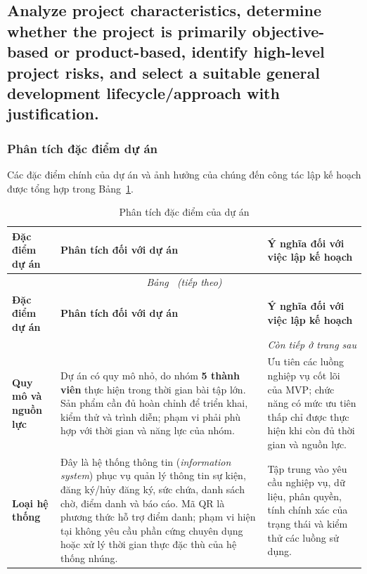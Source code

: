 \subsection{Analyze project characteristics, determine whether the project is primarily objective-based or product-based, identify high-level project risks, and select a suitable general development lifecycle/approach with justification.}

\subsubsection{Phân tích đặc điểm dự án}

Các đặc điểm chính của dự án và ảnh hưởng của chúng đến công tác lập kế hoạch được tổng hợp trong Bảng~\ref{tab:project-characteristics}.

{%
\setlength{\tabcolsep}{4pt}
\renewcommand{\arraystretch}{1.2}
\begin{longtable}{|p{3.1cm}|p{6.1cm}|p{5.5cm}|}
\caption{Phân tích đặc điểm của dự án}\label{tab:project-characteristics}\\
\hline
\textbf{Đặc điểm dự án} & \textbf{Phân tích đối với dự án} & \textbf{Ý nghĩa đối với việc lập kế hoạch} \\
\hline
\endfirsthead
\multicolumn{3}{c}{\textit{Bảng~\thetable{} (tiếp theo)}}\\
\hline
\textbf{Đặc điểm dự án} & \textbf{Phân tích đối với dự án} & \textbf{Ý nghĩa đối với việc lập kế hoạch} \\
\hline
\endhead
\hline
\multicolumn{3}{r}{\textit{Còn tiếp ở trang sau}}\\
\endfoot
\hline
\endlastfoot
\textbf{Quy mô và nguồn lực} & Dự án có quy mô nhỏ, do nhóm \textbf{5 thành viên} thực hiện trong thời gian bài tập lớn. Sản phẩm cần đủ hoàn chỉnh để triển khai, kiểm thử và trình diễn; phạm vi phải phù hợp với thời gian và năng lực của nhóm. & Ưu tiên các luồng nghiệp vụ cốt lõi của MVP; chức năng có mức ưu tiên thấp chỉ được thực hiện khi còn đủ thời gian và nguồn lực. \\
\hline
\textbf{Loại hệ thống} & Đây là hệ thống thông tin (\textit{information system}) phục vụ quản lý thông tin sự kiện, đăng ký/hủy đăng ký, sức chứa, danh sách chờ, điểm danh và báo cáo. Mã QR là phương thức hỗ trợ điểm danh; phạm vi hiện tại không yêu cầu phần cứng chuyên dụng hoặc xử lý thời gian thực đặc thù của hệ thống nhúng. & Tập trung vào yêu cầu nghiệp vụ, dữ liệu, phân quyền, tính chính xác của trạng thái và kiểm thử các luồng sử dụng. \\

\end{longtable}}
